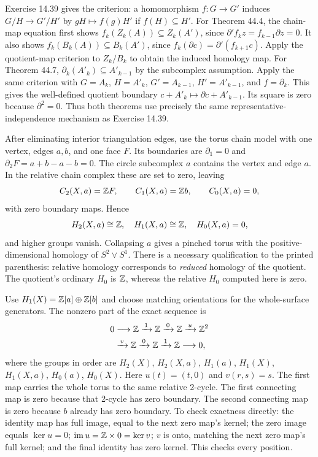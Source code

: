 Exercise 14.39 gives the criterion: a homomorphism $f:G\to G'$ induces $G/H\to G'/H'$ by $gH\mapsto f(g)H'$ if $f(H)\subseteq H'$.
For Theorem 44.4, the chain-map equation first shows $f_k(Z_k(A))\subseteq Z_k(A')$, since $\partial'f_kz=f_{k-1}\partial z=0$. It also shows $f_k(B_k(A))\subseteq B_k(A')$, since $f_k(\partial c)=\partial'(f_{k+1}c)$. Apply the quotient-map criterion to $Z_k/B_k$ to obtain the induced homology map.
For Theorem 44.7, $\partial_k(A'_k)\subseteq A'_{k-1}$ by the subcomplex assumption. Apply the same criterion with $G=A_k$, $H=A'_k$, $G'=A_{k-1}$, $H'=A'_{k-1}$, and $f=\partial_k$. This gives the well-defined quotient boundary $c+A'_k\mapsto\partial c+A'_{k-1}$. Its square is zero because $\partial^2=0$.
Thus both theorems use precisely the same representative-independence mechanism as Exercise 14.39.

After eliminating interior triangulation edges, use the torus chain model with one vertex, edges $a,b$, and one face $F$. Its boundaries are $\partial_1=0$ and $\partial_2F=a+b-a-b=0$.
The circle subcomplex $a$ contains the vertex and edge $a$. In the relative chain complex these are set to zero, leaving
\[
C_2(X,a)=\mathbb{Z} F,\qquad C_1(X,a)=\mathbb{Z} b,\qquad C_0(X,a)=0,
\]
with zero boundary maps. Hence
\[
H_2(X,a)\cong\mathbb{Z},\quad H_1(X,a)\cong\mathbb{Z},
\quad H_0(X,a)=0,
\]
and higher groups vanish.
Collapsing $a$ gives a pinched torus with the positive-dimensional homology of $S^2\vee S^1$. There is a necessary qualification to the printed parenthesis: relative homology corresponds to \emph{reduced} homology of the quotient. The quotient's ordinary $H_0$ is $\mathbb{Z}$, whereas the relative $H_0$ computed here is zero.

Use $H_1(X)=\mathbb{Z}[a]\oplus\mathbb{Z}[b]$ and choose matching orientations for the whole-surface generators. The nonzero part of the exact sequence is
\[
\begin{aligned}
0&\longrightarrow\mathbb{Z}\xrightarrow{\,1\,}\mathbb{Z}
\xrightarrow{\,0\,}\mathbb{Z}
\xrightarrow{\,u\,}\mathbb{Z}^2\\
&\xrightarrow{\,v\,}\mathbb{Z}
\xrightarrow{\,0\,}\mathbb{Z}
\xrightarrow{\,1\,}\mathbb{Z}\longrightarrow0,
\end{aligned}
\]
where the groups in order are $H_2(X)$, $H_2(X,a)$, $H_1(a)$, $H_1(X)$, $H_1(X,a)$, $H_0(a)$, $H_0(X)$.
Here $u(t)=(t,0)$ and $v(r,s)=s$. The first map carries the whole torus to the same relative 2-cycle. The first connecting map is zero because that 2-cycle has zero boundary. The second connecting map is zero because $b$ already has zero boundary.
To check exactness directly: the identity map has full image, equal to the next zero map's kernel; the zero image equals $\ker u=0$; $\operatorname{im}u=\mathbb{Z}\times0=\ker v$; $v$ is onto, matching the next zero map's full kernel; and the final identity has zero kernel. This checks every position.

